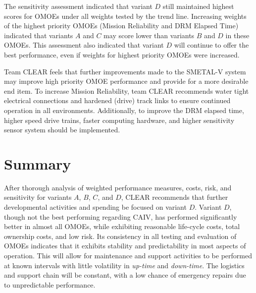 \documentclass[letterpaper,10pt]{article}
\begin{document}
The sensitivity assessment indicated that variant $D$ still maintained highest scores for OMOEs under all weights tested by the trend line. Increasing weights of the highest priority OMOEs (Mission Reliability and DRM Elapsed Time) indicated that variants $A$ and $C$ may score lower than variants $B$ and $D$ in these OMOEs. This assessment also indicated that variant $D$ will continue to offer the best performance, even if weights for highest priority OMOEs were increased.

Team CLEAR feels that further improvements made to the SMETAL-V system may improve high priority OMOE performance and provide for a more desirable end item. To increase Mission Reliability, team CLEAR recommends water tight electrical connections and hardened (drive) track links to ensure continued operation in all environments. Additionally, to improve the DRM elapsed time, higher speed drive trains, faster computing hardware, and higher sensitivity sensor system should be implemented. 

\section{Summary}
After thorough analysis of weighted performance measures, costs, risk, and sensitivity for variants $A$, $B$, $C$, and $D$, CLEAR recommends that further developmental activities and spending be focused on variant $D$. Variant $D$, though not the best performing regarding CAIV, has performed significantly better in almost all OMOEs, while exhibiting reasonable life-cycle costs, total ownership costs, and low risk. Its consistency in all testing and evaluation of OMOEs indicates that it exhibits stability and predictability in most aspects of operation. This will allow for maintenance and support activities to be performed at known intervals with little volatility in \emph{up-time} and \emph{down-time}. The logistics and support chain will be constant, with a low chance of emergency repairs due to unpredictable performance.
\end{document}
